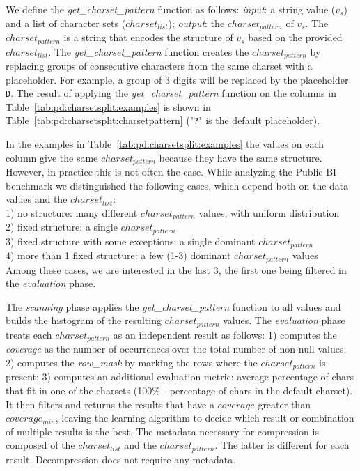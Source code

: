 We define the \textit{get\_charset\_pattern} function as follows: \textit{input}: a string value (\(v_{s}\)) and a list of character sets (\(charset_{list}\)); \textit{output}: the \(charset_{pattern}\) of \(v_{s}\). The \(charset_{pattern}\) is a string that encodes the structure of \(v_{s}\) based on the provided \(charset_{list}\). The \textit{get\_charset\_pattern} function creates the \(charset_{pattern}\) by replacing groups of consecutive characters from the same charset with a placeholder. For example, a group of 3 digits will be replaced by the placeholder \verb|D|. The result of applying the \textit{get\_charset\_pattern} function on the columns in Table~\ref{tab:pd:charsetsplit:examples} is shown in Table~\ref{tab:pd:charsetsplit:charsetpattern} ("\verb|?|" is the default placeholder).



In the examples in Table~\ref{tab:pd:charsetsplit:examples} the values on each column give the same \(charset_{pattern}\) because they have the same structure. However, in practice this is not often the case. While analyzing the Public BI benchmark we distinguished the following cases, which depend both on the data values and the \(charset_{list}\):\\
1) no structure: many different \(charset_{pattern}\) values, with uniform distribution\\
2) fixed structure: a single \(charset_{pattern}\)\\
3) fixed structure with some exceptions: a single dominant \(charset_{pattern}\)\\
4) more than 1 fixed structure: a few (1-3) dominant \(charset_{pattern}\) values\\
Among these cases, we are interested in the last 3, the first one being filtered in the \textit{evaluation} phase.

The \textit{scanning} phase applies the \textit{get\_charset\_pattern} function to all values and builds the histogram of the resulting \(charset_{pattern}\) values. The \textit{evaluation} phase treats each \(charset_{pattern}\) as an independent result as follows: 1) computes the \textit{coverage} as the number of occurrences over the total number of non-null values; 2) computes the \textit{row\_mask} by marking the rows where the \(charset_{pattern}\) is present; 3) computes an additional evaluation metric: average percentage of chars that fit in one of the charsets (100\% - percentage of chars in the default charset). It then filters and returns the results that have a \(coverage\) greater than \(coverage_{min}\), leaving the learning algorithm to decide which result or combination of multiple results is the best. The metadata necessary for compression is composed of the \(charset_{list}\) and the \(charset_{pattern}\). The latter is different for each result. Decompression does not require any metadata.

